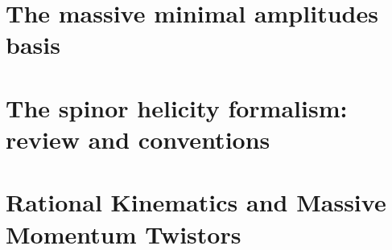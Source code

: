 \documentclass[aps,prd,nofootinbib,twocolumn,10pt]{revtex4-2}
\begin{document}
\section{The massive minimal amplitudes basis}

    
\appendix

\section{The spinor helicity formalism: review and conventions}
\label{sec:spinorhelicity}

\section{Rational Kinematics and Massive Momentum Twistors}
    \label{sec:massivetwistors}



\end{document}
